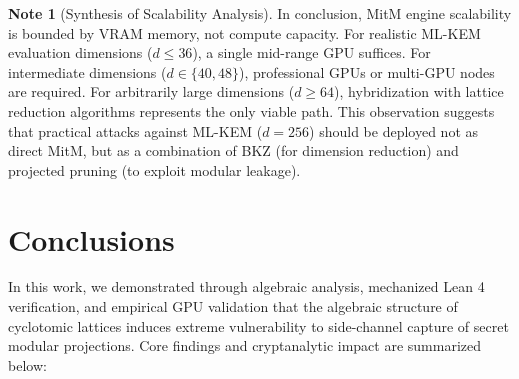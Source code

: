 \documentclass[11pt,a4paper]{article}
\theoremstyle{plain}
\theoremstyle{definition}
\newtheorem{remark}[teorema]{Note}
\numberwithin{equation}{section}
\begin{document}
\begin{remark}[Synthesis of Scalability Analysis]
\label{rem:sintesis_escalabilidad}
In conclusion, MitM engine scalability is bounded by VRAM memory, not compute capacity. For realistic ML-KEM evaluation dimensions ($d \le 36$), a single mid-range GPU suffices. For intermediate dimensions ($d \in \{40, 48\}$), professional GPUs or multi-GPU nodes are required. For arbitrarily large dimensions ($d \ge 64$), hybridization with lattice reduction algorithms represents the only viable path. This observation suggests that practical attacks against ML-KEM ($d=256$) should be deployed not as direct MitM, but as a combination of BKZ (for dimension reduction) and projected pruning (to exploit modular leakage).
\end{remark}

\section{Conclusions}
\label{sec:conclusiones}

In this work, we demonstrated through algebraic analysis, mechanized Lean 4 verification, and empirical GPU validation that the algebraic structure of cyclotomic lattices induces extreme vulnerability to side-channel capture of secret modular projections. Core findings and cryptanalytic impact are summarized below:
\end{document}
